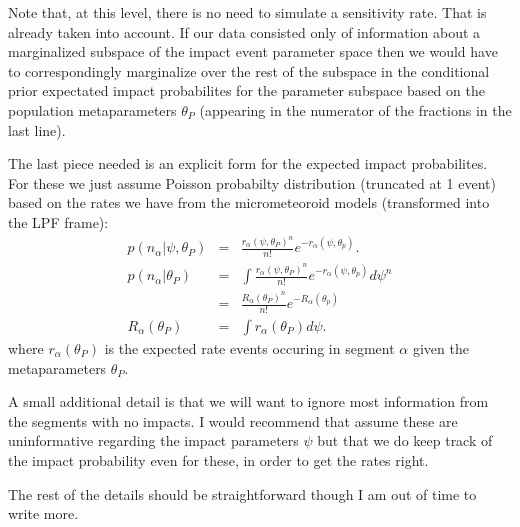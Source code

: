 \documentclass[twocolumn,showpacs,aps,prd,nobibnotes,nofootinbib,floatfix]{revtex4-1}
\begin{document}
Note that, at this level, there is no need to simulate a sensitivity rate.  That is already taken into account.  If our data consisted only of information about a marginalized subspace of the impact event parameter space then we would have to correspondingly marginalize over the rest of the subspace in the conditional prior expectated impact probabilites for the parameter subspace based on the population metaparameters $\theta_P$ (appearing in the numerator of the fractions in the last line).

The last piece needed is an explicit form for the expected impact probabilites.  For these we just assume Poisson probabilty distribution (truncated at 1 event) based on the rates we have from the micrometeoroid models (transformed into the LPF frame):
\begin{eqnarray*}
  p(n_\alpha|\psi,\theta_P)&=&\frac{r_\alpha(\psi,\theta_P)^n}{n!}e^{-r_\alpha(\psi,\theta_p)}.\\
  p(n_\alpha|\theta_P)&=&\int\frac{r_\alpha(\psi,\theta_P)^n}{n!}e^{-r_\alpha(\psi,\theta_p)}d\psi^n\\
  &=&\frac{R_\alpha(\theta_P)^n}{n!}e^{-R_\alpha(\theta_p)}\\
  R_\alpha(\theta_P)&=&\int{r_\alpha(\theta_P)}d\psi.
\end{eqnarray*}
where $r_\alpha(\theta_P)$ is the expected rate events occuring in segment $\alpha$ given the metaparameters $\theta_P$.  

A small additional detail is that we will want to ignore most information from the segments with no impacts.  I would recommend that assume these are uninformative regarding the impact parameters $\psi$ but that we do keep track of the impact probability even for these, in order to get the rates right.

The rest of the details should be straightforward though I am out of time to write more.
\end{document}
